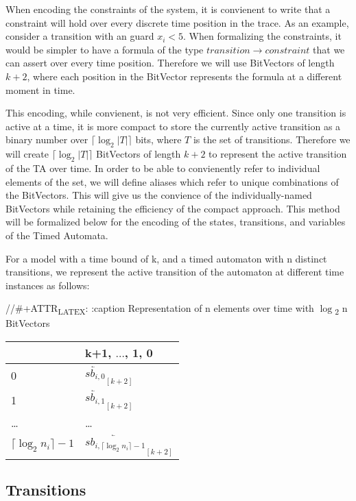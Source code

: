 \documentclass[a4paper,11pt]{article}
\begin{document}
When encoding the constraints of the system, it is convienent to write that a
constraint will hold over every discrete time position in the trace. As an
example, consider a transition with an guard \(x_i < 5\). When formalizing the
constraints, it would be simpler to have a formula of the type \(transition
\rightarrow constraint\) that we can assert over every time position. Therefore
we will use BitVectors of length \(k+2\), where each position in the BitVector
represents the formula at a different moment in time.

This encoding, while convienent, is not very efficient. Since only one
transition is active at a time, it is more compact to store the currently active
transition as a binary number over \(\lceil\log_2 |T|\rceil\) bits, where \(T\)
is the set of transitions. Therefore we will create \(\lceil\log_2 |T|\rceil\)
BitVectors of length \(k+2\) to represent the active transition of the TA over
time. In order to be able to convienently refer to individual elements of the
set, we will define aliases which refer to unique combinations of the
BitVectors. This will give us the convience of the individually-named BitVectors
while retaining the efficiency of the compact approach. This method will be
formalized below for the encoding of the states, transitions, and variables of
the Timed Automata.

For a model with a time bound of k, and a timed automaton with n distinct
transitions, we represent the active transition of the automaton at different
time instances as follows:

//\#+ATTR\textsubscript{LATEX}: :caption Representation of n elements over time with \(\log\)\textsubscript{2} n BitVectors
\begin{center}
\begin{tabular}{ll}
 & k+1, \(\ldots\), 1, 0\\
\hline
0 & \(\overleftarrow{sb_{i,0}}_{[k+2]}\)\\
1 & \(\overleftarrow{sb_{i,1}}_{[k+2]}\)\\
\ldots{} & \ldots{}\\
\(\lceil \log_2 n_i \rceil -1\) & \(\overleftarrow{sb_{i, \lceil \log_2 n_i \rceil -1}}_{[k+2]}\)\\
\end{tabular}
\end{center}


\subsection{Transitions}
\label{sec:org673fa45}
\end{document}
